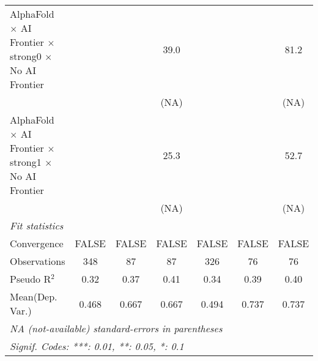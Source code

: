 \begin{tabular}{lcccccc}
   AlphaFold $\times$ AI Frontier $\times$ strong0 $\times$ No AI Frontier    &                        &        & 39.0   &                        &        & 81.2\\   
                                                                              &                        &        & (NA)   &                        &        & (NA)\\   
   AlphaFold $\times$ AI Frontier $\times$ strong1 $\times$ No AI Frontier    &                        &        & 25.3   &                        &        & 52.7\\   
                                                                              &                        &        & (NA)   &                        &        & (NA)\\   
   \midrule
   \emph{Fit statistics}\\
   Convergence                                                                &FALSE                   & FALSE  & FALSE  & FALSE                  & FALSE  & FALSE\\  
   Observations                                                               & 348                    & 87     & 87     & 326                    & 76     & 76\\  
   Pseudo R$^2$                                                               & 0.32                   & 0.37   & 0.41   & 0.34                   & 0.39   & 0.40\\  
Mean(Dep. Var.) & 0.468 & 0.667 & 0.667 & 0.494 & 0.737 & 0.737 \\
   \midrule \midrule
   \multicolumn{7}{l}{\emph{NA (not-available) standard-errors in parentheses}}\\
   \multicolumn{7}{l}{\emph{Signif. Codes: ***: 0.01, **: 0.05, *: 0.1}}\\
\end{tabular}
\par\endgroup
